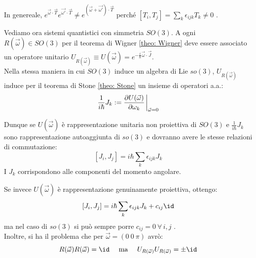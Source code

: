 \begin{remark}
    In genereale, \(e^{\vec{\omega}\cdot\vec{T}}e^{\vec{\omega'}\cdot\vec{T}} \neq e^{(\vec{\omega}+\vec{\omega'})\cdot\vec{T}}\) perché \(\left[ T_i, T_j \right]= \sum_k \epsilon_{ijk}T_k \neq 0\) .
\end{remark}

Vediamo ora sistemi quantistici con simmetria \(SO(3)\). A ogni \(R(\vec{\omega}) \in SO(3)\) per il teorema di Wigner \ref{theo: Wigner} deve essere associato un operatore unitario \(U_{R(\vec{\omega})}\equiv U(\vec{\omega})= e^{-\frac{i}{\hbar}\vec{\omega}\cdot\vec{J}}\).\\
Nella stessa maniera in cui \(SO(3)\) induce un algebra di Lie \(so(3)\), \(U_{R(\vec{\omega})}\) induce per il teorema di Stone \ref{theo: Stone} un insieme di operatori a.a.:
\begin{equation}
    \frac{1}{i\hbar} J_k := \pdv{U(\vec{\omega})}{\omega_k}\eval_{\vec{\omega}=0}
\end{equation}

Dunque se \(U(\vec{\omega})\) è rappresentazione unitaria non proiettiva di \(SO(3)\) e \(\frac{1}{i\hbar}J_k\) sono rappresentazione autoaggiunta di \(so(3)\) e dovranno avere le stesse relazioni di commutazione:
\begin{equation}
    \left[ J_i , J_j\right] = i\hbar\sum_k \epsilon_{ijk} J_k
\end{equation}
I \(J_k\) corrispondono alle componenti del momento angolare.

Se invece \(U(\vec{\omega})\) è rappresentazione genuinamente proiettiva, ottengo:
\[
    \left[ J_i , J_j\right] = i\hbar\sum_k \epsilon_{ijk} J_k + c_{ij} \id 
\]
ma nel caso di \(so(3)\) si può sempre porre \(c_{ij}= 0 \ \forall\,i,j\) .\\
Inoltre, si ha il problema che per \(\vec{\omega}= (0 \ 0 \ \pi)\) avrò:
\[
    R(\vec{\omega })R(\vec{\omega}) = \id  \quad  \text{ ma }\quad  U_{R(\vec{\omega}) }U_{R(\vec{\omega}) }= \pm \id 
\]


